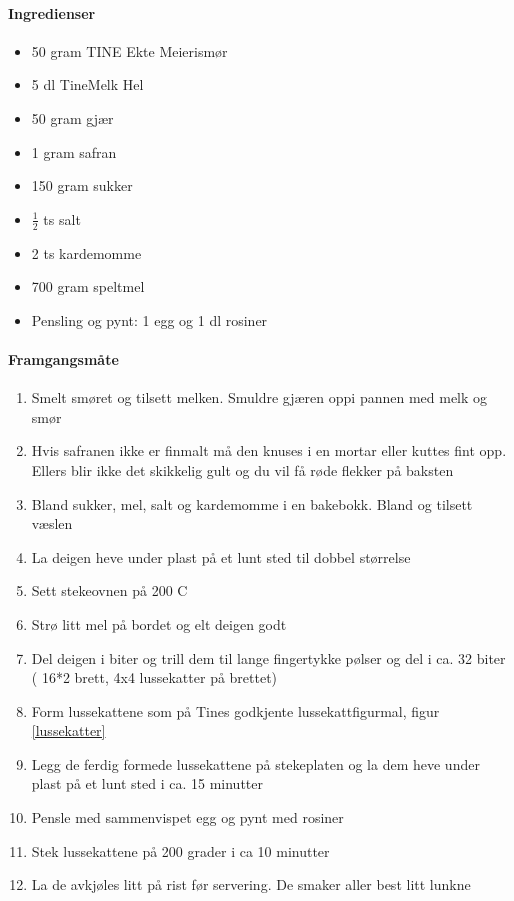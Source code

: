 \documentclass[12pt,a4paper]{book}
\begin{document}
{\paragraph{Ingredienser}
\begin{itemize}[noitemsep]
	\item 50 gram TINE Ekte Meierismør
	\item 5 dl TineMelk Hel
	\item 50 gram gjær
	\item 1 gram safran
	\item 150 gram sukker
	\item $\frac{1}{2}$ ts salt
	\item 2 ts kardemomme
	\item 700 gram speltmel
	\item Pensling og pynt: 1 egg og 1 dl rosiner
\end{itemize}

\paragraph{Framgangsmåte}
\begin{enumerate}[noitemsep]
	\item Smelt smøret og tilsett melken. Smuldre gjæren oppi pannen med melk og smør
	\item Hvis safranen ikke er finmalt må den knuses i en mortar eller kuttes fint opp. Ellers blir ikke det skikkelig gult og du vil få røde flekker på baksten
	\item Bland sukker, mel, salt og kardemomme i en bakebokk. Bland og tilsett væslen
	\item La deigen heve under plast på et lunt sted til dobbel størrelse
	\item Sett stekeovnen på 200 \degree C
	\item Strø litt mel på bordet og elt deigen godt
	\item Del deigen i biter og trill dem til lange fingertykke pølser og del i ca. 32 biter ( 16*2 brett, 4x4 lussekatter på brettet)
	\item Form lussekattene som på Tines godkjente lussekattfigurmal, figur  \ref{lussekatter}
	\item Legg de ferdig formede lussekattene på stekeplaten og la dem heve under plast på et lunt sted i ca. 15 minutter
	\item Pensle med sammenvispet egg og pynt med rosiner
	\item Stek lussekattene på 200 grader i  ca 10 minutter
	\item La de avkjøles litt på rist før servering. De smaker aller best litt lunkne
\end{enumerate}

}
\end{document}

